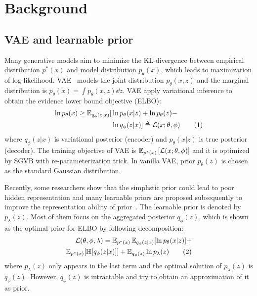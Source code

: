 \section{Background}

\subsection{VAE and learnable prior}

Many generative models aim to minimize the KL-divergence between empirical distribution $p^*(x)$ and model distribution $p_\theta(x)$, which leads to maximization of log-likelihood. VAE~\cite{kingma2014auto} models the joint distribution $p_\theta(x, z)$ and the marginal distribution is $p_\theta(x) = \int p_\theta(x, z) \dd z$. VAE apply variational inference to obtain the evidence lower bound objective (ELBO): 
\begin{align*} \label{eq:ELBO}
\ln p_\theta(x) \geq \operatorname{\mathbb{E}}_{q_\phi(z|x)} [  &  \ln p_\theta(x|z) + \ln p_\theta(z) - \\ & \ln q_\phi(z|x) ] 
\triangleq \mathcal{L}(x; \theta, \phi) \tag{1}
\end{align*}
where $q_\phi(z|x)$ is variational posterior (encoder) and $p_\theta(x|z)$ is true posterior (decoder). The training objective of VAE is $\operatorname{\mathbb{E}}_{{p^*(x)}}\left[{\mathcal{L}(x; \theta, \phi)}\right]$ and it is optimized by SGVB with re-parameterization trick. In vanilla VAE, prior $p_\theta(z)$ is chosen as the standard Gaussian distribution. 

Recently, some researchers show that the simplistic prior could lead to poor hidden representation and many learnable priors are proposed subsequently to improve the representation ability of prior~\cite{tomczak2018vae, takahashi2019variational, bauer2019resampled}. The learnable prior is denoted by $p_\lambda(z)$. Most of them focus on the aggregated posterior $q_\phi(z)$, which is shown as the optimal prior for ELBO by following decomposition:
\begin{align*} \label{eq:second-decomposition}
\mathcal{L}(\theta, \phi, \lambda) = \operatorname{\mathbb{E}}_{p^*(x)}\operatorname{\mathbb{E}}_{q_\phi(z|x)} [ \ln p_\theta(x|z)] + \\ 
\operatorname{\mathbb{E}}_{p^*(x)}[\mathbb{H}[q_\phi(z|x)]] + \operatorname{\mathbb{E}}_{q_\phi(z)} \ln p_\lambda(z) \tag{2}
\end{align*}
where $p_\lambda(z)$ only appears in the last term and the optimal solution of $p_\lambda(z)$ is $q_\phi(z)$. However, $q_\phi(z)$ is intractable and \cite{tomczak2018vae,takahashi2019variational} try to obtain an approximation of it as prior. 

